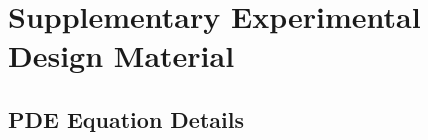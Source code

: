 


\newpage
\section{Supplementary Experimental Design Material}

\subsection{PDE Equation Details}

